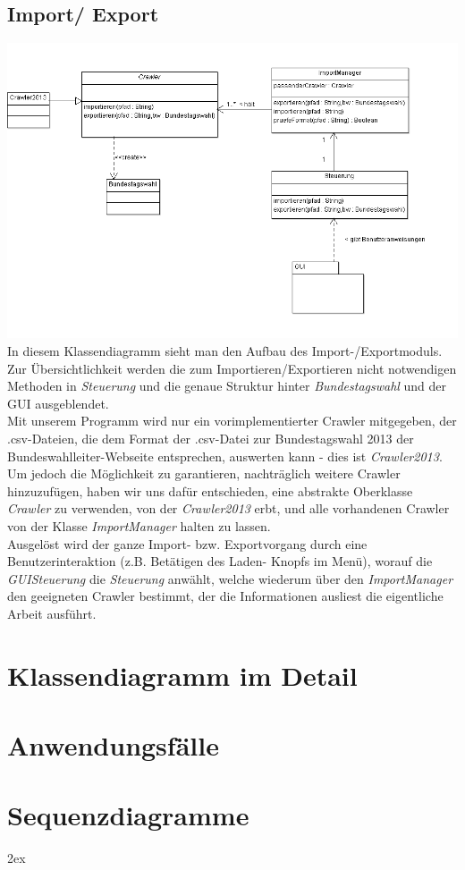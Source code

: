 \documentclass[10pt,a4paper]{article}
\begin{document}
\subsection{Import/ Export}
\includegraphics[scale=0.5]{Import-Export} \\
In diesem Klassendiagramm sieht man den Aufbau des Import-/Exportmoduls. Zur Übersichtlichkeit werden die zum Importieren/Exportieren nicht notwendigen Methoden in \textit{Steuerung} und die genaue Struktur hinter \textit{Bundestagswahl} und der GUI ausgeblendet. \\
Mit unserem Programm wird nur ein vorimplementierter Crawler mitgegeben, der .csv-Dateien, die dem Format der .csv-Datei zur Bundestagswahl 2013 der Bundeswahlleiter-Webseite entsprechen, auswerten kann - dies ist \textit{Crawler2013}. Um jedoch die Möglichkeit zu garantieren, nachträglich weitere Crawler hinzuzufügen, haben wir uns dafür entschieden, eine abstrakte Oberklasse \textit{Crawler} zu verwenden, von der \textit{Crawler2013} erbt, und alle vorhandenen Crawler von der Klasse \textit{ImportManager} halten zu lassen. \\ Ausgelöst wird der ganze Import- bzw. Exportvorgang durch eine Benutzerinteraktion (z.B. Betätigen des Laden- Knopfs im Menü), worauf die \textit{GUISteuerung} die \textit{Steuerung} anwählt, welche wiederum über den \textit{ImportManager} den geeigneten Crawler bestimmt, der die Informationen ausliest die eigentliche Arbeit ausführt.


\section{Klassendiagramm im Detail}




\section{Anwendungsfälle}



\section{Sequenzdiagramme}


\begingroup
\parindent 0pt
\parskip 2ex
\def\enotesize{\normalsize}

\endgroup
\end{document}
